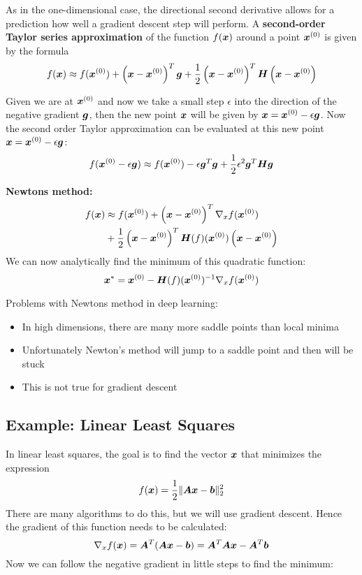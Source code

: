 \begin{multicols}{2}
	As in the one-dimensional case, the directional second derivative allows for a prediction how well a gradient descent step will perform. A \textbf{second-order Taylor series approximation} of the function $f(\bol{x})$ around a point $\bol{x}^{(0)}$ is given by the formula
	\[ f(\bol{x}) \approx f(\bol{x}^{(0)}) + \left( \bol{x}-\bol{x}^{(0)} \right)^T\bol{g}+
	\frac{1}{2} \left( \bol{x}-\bol{x}^{(0)} \right)^T\bol{H}\left( \bol{x}-\bol{x}^{(0)} \right) \]

	Given we are at $\bol{x}^{(0)}$ and now we take a small step $\epsilon$ into the direction of the negative gradient $\bol{g}$, then the new point $\bol{x}$ will be given by $\bol{x}=\bol{x}^{(0)}-\epsilon\bol{g}$.
	Now the second order Taylor approximation can be evaluated at this new point $\bol{x}=\bol{x}^{(0)}-\epsilon\bol{g}$:
	\[ f(\bol{x}^{(0)}-\epsilon\bol{g}) \approx f(\bol{x}^{(0)})-\epsilon \bol{g}^T\bol{g}+\frac{1}{2}
	\epsilon^2 \bol{g}^T\bol{H}\bol{g} \]

	\textbf{Newtons method:}
	\begin{align*}
	f(\bol{x}) &\approx f(\bol{x}^{(0)}) + \left( \bol{x}-\bol{x}^{(0)} \right)^T \nabla_x f(\bol{x}^{(0)}) \\
	&+\frac{1}{2} \left( \bol{x}-\bol{x}^{(0)} \right)^T \bol{H}(f)(\bol{x}^{(0)})\left( \bol{x}-\bol{x}^{(0)} \right)
	\end{align*}
	We can now analytically find the minimum of this quadratic function:
	\[ \bol{x}^\ast = \bol{x}^{(0)} - \bol{H}(f)(\bol{x}^{(0)})^{-1}\nabla_x f(\bol{x}^{(0)}) \]

	Problems with Newtons method in deep learning:
	\begin{itemize}
		\item In high dimensions, there are many more saddle points than local minima
		\item Unfortunately Newton’s method will jump to a saddle point and then will be stuck
		\item This is not true for gradient descent
	\end{itemize}

	\subsection{Example: Linear Least Squares}
	In linear least squares, the goal is to find the vector $\bol{x}$ that minimizes the expression
	\[ f(\bol{x}) = \frac{1}{2} \lVert \bol{Ax}-\bol{b}\rVert_2^2 \]
	There are many algorithms to do this, but we will use gradient descent.
	Hence the gradient of this function needs to be calculated:
	\[ \nabla_xf(\bol{x}) =\bol{A}^T (\bol{Ax}-\bol{b}) = \bol{A}^T\bol{Ax}-\bol{A}^T\bol{b} \]
	Now we can follow the negative gradient in little steps to find the minimum:


\end{multicols}
